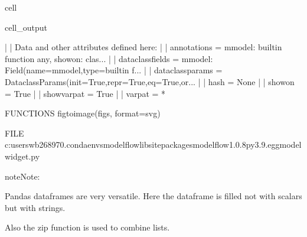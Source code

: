 \documentclass[letterpaper,10pt,english]{jupyterBook}
\begin{document}
\begin{sphinxuseclass}{cell}
\begin{sphinxVerbatimOutput}
\begin{sphinxuseclass}{cell_output}
\begin{sphinxVerbatim}[commandchars=\\\{\}]
     |  \PYGZhy{}\PYGZhy{}\PYGZhy{}\PYGZhy{}\PYGZhy{}\PYGZhy{}\PYGZhy{}\PYGZhy{}\PYGZhy{}\PYGZhy{}\PYGZhy{}\PYGZhy{}\PYGZhy{}\PYGZhy{}\PYGZhy{}\PYGZhy{}\PYGZhy{}\PYGZhy{}\PYGZhy{}\PYGZhy{}\PYGZhy{}\PYGZhy{}\PYGZhy{}\PYGZhy{}\PYGZhy{}\PYGZhy{}\PYGZhy{}\PYGZhy{}\PYGZhy{}\PYGZhy{}\PYGZhy{}\PYGZhy{}\PYGZhy{}\PYGZhy{}\PYGZhy{}\PYGZhy{}\PYGZhy{}\PYGZhy{}\PYGZhy{}\PYGZhy{}\PYGZhy{}\PYGZhy{}\PYGZhy{}\PYGZhy{}\PYGZhy{}\PYGZhy{}\PYGZhy{}\PYGZhy{}\PYGZhy{}\PYGZhy{}\PYGZhy{}\PYGZhy{}\PYGZhy{}\PYGZhy{}\PYGZhy{}\PYGZhy{}\PYGZhy{}\PYGZhy{}\PYGZhy{}\PYGZhy{}\PYGZhy{}\PYGZhy{}\PYGZhy{}\PYGZhy{}\PYGZhy{}\PYGZhy{}\PYGZhy{}\PYGZhy{}\PYGZhy{}\PYGZhy{}
     |  Data and other attributes defined here:
     |  
     |  \PYGZus{}\PYGZus{}annotations\PYGZus{}\PYGZus{} = \PYGZob{}\PYGZsq{}mmodel\PYGZsq{}: \PYGZlt{}built\PYGZhy{}in function any\PYGZgt{}, \PYGZsq{}show\PYGZus{}on\PYGZsq{}: \PYGZlt{}clas...
     |  
     |  \PYGZus{}\PYGZus{}dataclass\PYGZus{}fields\PYGZus{}\PYGZus{} = \PYGZob{}\PYGZsq{}mmodel\PYGZsq{}: Field(name=\PYGZsq{}mmodel\PYGZsq{},type=\PYGZlt{}built\PYGZhy{}in f...
     |  
     |  \PYGZus{}\PYGZus{}dataclass\PYGZus{}params\PYGZus{}\PYGZus{} = \PYGZus{}DataclassParams(init=True,repr=True,eq=True,or...
     |  
     |  \PYGZus{}\PYGZus{}hash\PYGZus{}\PYGZus{} = None
     |  
     |  show\PYGZus{}on = True
     |  
     |  showvarpat = True
     |  
     |  varpat = \PYGZsq{}*\PYGZsq{}

FUNCTIONS
    fig\PYGZus{}to\PYGZus{}image(figs, format=\PYGZsq{}svg\PYGZsq{})

FILE
    c:\PYGZbs{}users\PYGZbs{}wb268970\PYGZbs{}.conda\PYGZbs{}envs\PYGZbs{}modelflow\PYGZbs{}lib\PYGZbs{}site\PYGZhy{}packages\PYGZbs{}modelflow\PYGZhy{}1.0.8\PYGZhy{}py3.9.egg\PYGZbs{}modelwidget.py
\end{sphinxVerbatim}

\end{sphinxuseclass}\end{sphinxVerbatimOutput}

\end{sphinxuseclass}
\begin{sphinxadmonition}{note}{Note:}
\sphinxAtStartPar
{}

\sphinxAtStartPar
Pandas dataframes are very versatile. Here the dataframe is filled not with scalars but with strings.

\sphinxAtStartPar
Also the zip function is used to combine lists. 
\end{sphinxadmonition}
\end{document}
